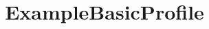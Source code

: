 \documentclass{test}
\begin{document}
\title{ExampleBasicProfile} \maketitle \noindent




\end{document}
